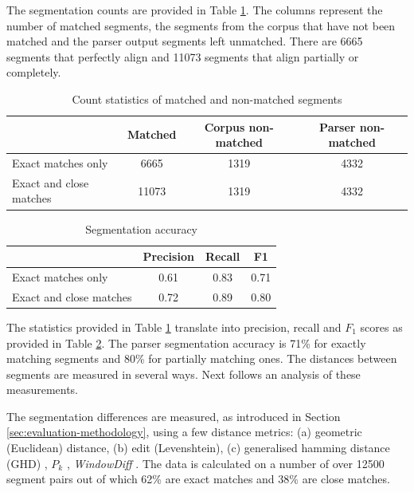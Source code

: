     The segmentation counts are provided in Table \ref{tab:segmentation-stats}. The columns represent  the number of matched segments, the segments from the corpus that have not been matched and the parser output segments left unmatched. There are 6665 segments that perfectly align and 11073 segments that align partially or completely. %
    
    \begin{table}[!ht]
    \centering
    \begin{tabular}{lccc}
    \toprule
    {} &  Matched &  Corpus non-matched &  Parser non-matched \\
    \midrule
    Exact matches only &     6665 &                1319 &                4332 \\
    Exact and close matches &    11073 &                1319 &                4332 \\
    \bottomrule
    \end{tabular}
    \caption{Count statistics of matched and non-matched segments}
    \label{tab:segmentation-stats}
    \end{table}
    
    
    \begin{table}[!ht]
    \centering
    \begin{tabular}{lccc}
    \toprule
    {} &  Precision &  Recall &   F1 \\
    \midrule
    Exact matches only &        0.61 &    0.83 & 0.71 \\
    Exact and close matches                &        0.72 &    0.89 & 0.80 \\
    \bottomrule
    \end{tabular}
    \caption{Segmentation accuracy}
    \label{tab:segmentation-accuracy}
    \end{table}
    
    The statistics provided in Table \ref{tab:segmentation-stats} translate into precision, recall and $F_1$ scores as provided in Table \ref{tab:segmentation-accuracy}. The parser segmentation accuracy is 71\% for exactly matching segments and 80\% for partially matching ones. The distances between segments are measured in several ways. Next follows an analysis of these measurements. 
    
    The segmentation differences are measured, as introduced in Section \ref{sec:evaluation-methodology}, using a few distance metrics: (a) geometric (Euclidean) distance, (b) edit (Levenshtein), (c) generalised hamming distance (GHD) \citep{Bookstein2002}, $P_k$ \citep[198--200]{beeferman1999statistical}, \textit{WindowDiff} \citep[10]{pevzner2002critique}. 
    The data is calculated on a number of over 12500 segment pairs out of which 62\% are exact matches and 38\% are close matches. 
    
